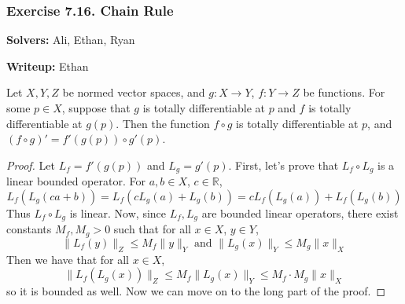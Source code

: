 \documentclass{article}
\theoremstyle{plain} %
\numberwithin{thm}{section} %
\theoremstyle{definition}
\begin{document}
    \subsubsection{Exercise 7.16. Chain Rule}

    \textbf{Solvers:} Ali, Ethan, Ryan

    \noindent\textbf{Writeup:} Ethan

    Let \(X,Y,Z\) be normed vector spaces, and \(g: X \to Y\), \(f: Y \to Z\) be functions. For some \(p \in X\), suppose that \(g\) is totally differentiable at \(p\) and \(f\) is totally differentiable at \(g(p)\). Then the function \(f \circ g\) is totally differentiable at \(p\), and \((f \circ g)' = f'(g(p)) \circ g'(p)\).

	\begin{proof}
		Let \(L_f = f'(g(p))\) and \(L_g = g'(p)\). First, let's prove that \(L_f \circ L_g\) is a linear bounded operator. For \(a,b \in X\), \(c \in \mathbb{R}\),
		\[
			L_f(L_g(ca + b)) = L_f(cL_g(a) + L_g(b)) = cL_f(L_g(a)) + L_f(L_g(b))
		\]
		Thus \(L_f \circ L_g\) is linear. Now, since \(L_f, L_g\) are bounded linear operators, there exist constants \(M_f, M_g > 0\) such that for all \(x \in X\), \(y \in Y\),
		\[
			\|L_f(y)\| _Z \leq M_f \|y\| _Y \text{ and } \|L_g(x)\| _Y \leq M_g \|x\| _X
		\]
		Then we have that for all \(x \in X\),
		\[
			\|L_f(L_g(x))\| _Z \leq M_f\|L_g(x)\| _Y \leq M_f \cdot M_g \|x\| _X
		\]
		so it is bounded as well. Now we can move on to the long part of the proof.
  

\end{proof}
\end{document}
